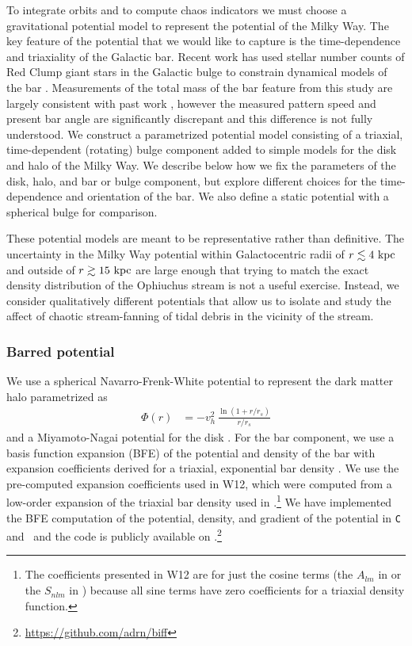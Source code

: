 \documentclass[letterpaper,12pt,preprint]{aastex}
\begin{document}
To integrate orbits and to compute chaos indicators we must choose a gravitational potential model to represent the potential of the Milky Way. The key feature of the potential that we would like to capture is the time-dependence and triaxiality of the Galactic bar. Recent work has used stellar number counts of Red Clump giant stars in the Galactic bulge to constrain dynamical models of the bar \citep{portail15}. Measurements of the total mass of the bar feature from this study are largely consistent with past work \citep[e.g.,][]{wang12}, however the measured pattern speed and present bar angle are significantly discrepant and this difference is not fully understood. We construct a parametrized potential model consisting of a triaxial, time-dependent (rotating) bulge component added to simple models for the disk and halo of the Milky Way. We describe below how we fix the parameters of the disk, halo, and bar or bulge component, but explore different choices for the time-dependence and orientation of the bar. We also define a static potential with a spherical bulge for comparison.

These potential models are meant to be representative rather than definitive. The uncertainty in the Milky Way potential within Galactocentric radii of $r\lesssim 4~{\rm kpc}$ and outside of $r\gtrsim 15~{\rm kpc}$ are large enough that trying to match the exact density distribution of the Ophiuchus stream is not a useful exercise. Instead, we consider qualitatively different potentials that allow us to isolate and study the affect of chaotic stream-fanning of tidal debris in the vicinity of the stream.

\subsubsection{Barred potential}
We use a spherical Navarro-Frenk-White potential to represent the dark matter halo \citep{navarro96} parametrized as
\begin{align}
	\Phi(r) &= -v_h^2\,\frac{\ln{(1 + r/r_s)}}{r/r_s}\label{eq:nfw}
\end{align}
and a Miyamoto-Nagai potential for the disk \citep{miyamoto75}. For the bar component, we use a basis function expansion (BFE) of the potential and density of the bar with expansion coefficients derived for a triaxial, exponential bar density \citep[][hereafter W12]{wang12}. We use the pre-computed expansion coefficients used in W12, which were computed from a low-order expansion of the triaxial bar density used in \citet{dwek95}.\footnote{The coefficients presented in W12 are for just the cosine terms (the $A_{lm}$ in \citet{hernquist92} or the $S_{nlm}$ in \citet{lowing11}) because all sine terms have zero coefficients for a triaxial density function.} We have implemented the BFE computation of the potential, density, and gradient of the potential in \texttt{C} and \python\ and the code is publicly available on \github.\footnote{\url{https://github.com/adrn/biff}}
\end{document}
